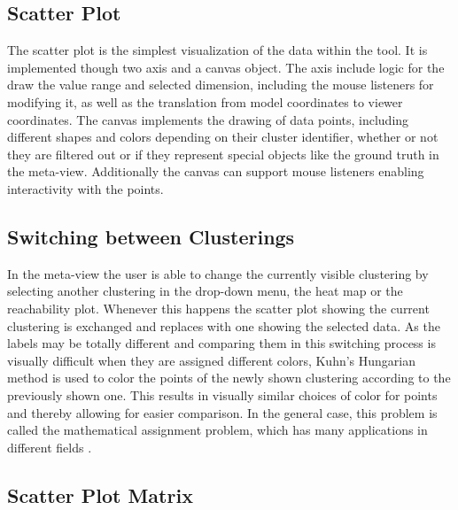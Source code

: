 \documentclass[
	a4paper,
	english,
	twoside,
	openright,               
	11pt                            
	]{report}
\begin{document}
\subsection{Scatter Plot}
The scatter plot is the simplest visualization of the data within the tool. It is implemented though two axis and a canvas object. The axis include logic for the draw the value range and selected dimension, including the mouse listeners for modifying it, as well as the translation from model coordinates to viewer coordinates. The canvas implements the drawing of data points, including different shapes and colors depending on their cluster identifier, whether or not they are filtered out or if they represent special objects like the ground truth in the meta-view. Additionally the canvas can support mouse listeners enabling interactivity with the points.

\subsection{Switching between Clusterings}

In the meta-view the user is able to change the currently visible clustering by selecting another clustering in the drop-down menu, the heat map or the reachability plot. Whenever this happens the scatter plot showing the current clustering is exchanged and replaces with one showing the selected data. As the labels may be totally different and comparing them in this switching process is visually difficult when they are assigned different colors, Kuhn’s Hungarian method \cite{Kuhn2010} is used to color the points of the newly shown clustering according to the previously shown one. This results in visually similar choices of color for points and thereby allowing for easier comparison. In the general case, this problem is called the mathematical assignment problem, which has many applications in different fields \cite{Kuhn2010}.

\subsection{Scatter Plot Matrix}
\end{document}
